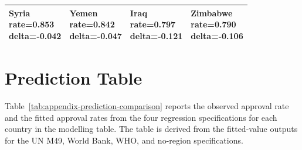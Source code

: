 \documentclass[runningheads]{llncs}
\begin{document}
{\begin{longtable}{p{}p{}p{}p{}}
\hline
\shortstack[l]{Syria\\ rate=0.853\\ delta=-0.042} &\shortstack[l]{Yemen\\ rate=0.842\\ delta=-0.047} &\shortstack[l]{Iraq\\ rate=0.797\\ delta=-0.121} &\shortstack[l]{Zimbabwe\\ rate=0.790\\ delta=-0.106} \\
\hline
\end{longtable}
}

\section{Prediction Table}

Table~\ref{tab:appendix-prediction-comparison} reports the observed approval rate and the fitted approval rates from the four regression specifications for each country in the modelling table. The table is derived from the fitted-value outputs for the UN M49, World Bank, WHO, and no-region specifications.
\end{document}
